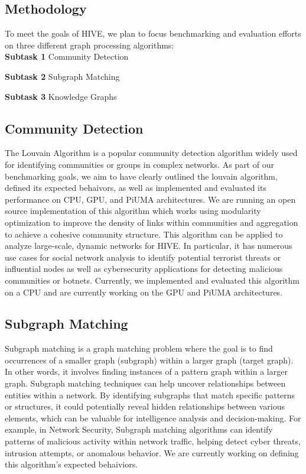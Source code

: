 \documentclass[letterpaper, 10pt]{article}
\begin{document}
\begin{multicols}{2}
    \section{Methodology}
    To meet the goals of HIVE, we plan to focus benchmarking and evaluation efforts on three different graph processing algorithms:\\  
    
        \textbf{Subtask 1} Community Detection
        
        \textbf{Subtask 2} Subgraph Matching
        
        \textbf{Subtask 3} Knowledge Graphs
        
        \subsection{Community Detection}
            The Louvain Algorithm is a popular community detection algorithm widely used for identifying communities or groups in complex networks. As part of our benchmarking goals, we aim to have clearly outlined the louvain algorithm, defined its expected behaivors, as well as implemented and evaluated its performance on CPU, GPU, and PiUMA architectures. We are running an open source implementation of this algorithm which works using modularity optimization to improve the density of links within communities and aggregation to achieve a cohesive community structure. This algorithm can be applied to analyze large-scale, dynamic networks for HIVE.  In particular, it has numerous use cases for social network analysis to identify potential terrorist threats or influential nodes as well as cybersecurity applications for detecting malicious communities or botnets. Currently, we implemented and evaluated this algorithm on a CPU and are currently working on the GPU and PiUMA architectures.
        \subsection{Subgraph Matching}
            Subgraph matching is a graph matching problem where the goal is to find occurrences of a smaller graph (subgraph) within a larger graph (target graph). In other words, it involves finding instances of a pattern graph within a larger graph. Subgraph matching techniques can help uncover relationships between entities within a network. By identifying subgraphs that match specific patterns or structures, it could potentially reveal hidden relationships between various elements, which can be valuable for intelligence analysis and decision-making. For example, in Network Security, Subgraph matching algorithms can identify patterns of malicious activity within network traffic, helping detect cyber threats, intrusion attempts, or anomalous behavior. We are currently working on defining this algorithm's expected behaiviors. 


\end{multicols}
\end{document}
